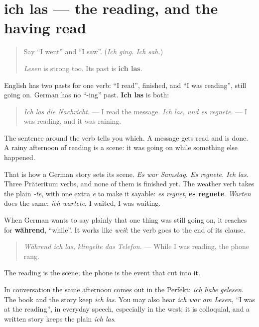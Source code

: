 \section[ich las / ich habe gelesen]{ich las — the reading, and the having read}

\label{lesson:GE-C252-ich-las}



\begin{quote}
Say \textquotedblleft{}I went\textquotedblright{} and \textquotedblleft{}I saw\textquotedblright{}. (\emph{Ich ging. Ich sah.})

\emph{Lesen} is strong too. Its past is \textbf{ich las}.
\end{quote}

\begin{grammarlens}[title={Grammar Lens: one past, two English meanings}]
English has two pasts for one verb: \textquotedblleft{}I read\textquotedblright{}, finished, and \textquotedblleft{}I was reading\textquotedblright{}, still going on. German has no \textquotedblleft{}-ing\textquotedblright{} past. \textbf{Ich las} is both:

\begin{quote}
\emph{Ich las die Nachricht.} — I read the message. \emph{Ich las, und es regnete.} — I was reading, and it was raining.
\end{quote}

The sentence around the verb tells you which. A message gets read and is done. A rainy afternoon of reading is a scene: it was going on while something else happened.

That is how a German story sets its scene. \emph{Es war Samstag. Es regnete. Ich las.} Three Präteritum verbs, and none of them is finished yet. The weather verb takes the plain \emph{-te}, with one extra \emph{e} to make it sayable: \emph{es regnet}, \textbf{es regnete}. \emph{Warten} does the same: \emph{ich wartete}, I waited, I was waiting.
\end{grammarlens}

\begin{culture}
When German wants to say plainly that one thing was still going on, it reaches for \textbf{während}, \textquotedblleft{}while\textquotedblright{}. It works like \emph{weil}: the verb goes to the end of its clause.

\begin{quote}
\emph{Während ich las, klingelte das Telefon.} — While I was reading, the phone rang.
\end{quote}

The reading is the scene; the phone is the event that cut into it.

In conversation the same afternoon comes out in the Perfekt: \emph{ich habe gelesen}. The book and the story keep \emph{ich las}. You may also hear \emph{ich war am Lesen}, \textquotedblleft{}I was at the reading\textquotedblright{}, in everyday speech, especially in the west; it is colloquial, and a written story keeps the plain \emph{ich las}.
\end{culture}

